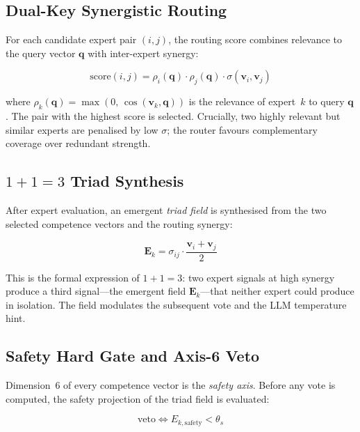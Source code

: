 \documentclass[journal,10pt,twocolumn]{IEEEtran}
\begin{document}
\subsection{Dual-Key Synergistic Routing}

For each candidate expert pair $(i, j)$, the routing score combines
relevance to the query vector $\mathbf{q}$ with inter-expert synergy:

\begin{equation}
  \mathrm{score}(i, j)
    = \rho_i(\mathbf{q}) \cdot \rho_j(\mathbf{q}) \cdot \sigma(\mathbf{v}_i, \mathbf{v}_j)
  \label{eq:routing}
\end{equation}

where $\rho_k(\mathbf{q}) = \max(0,\, \cos(\mathbf{v}_k, \mathbf{q}))$
is the relevance of expert~$k$ to query $\mathbf{q}$. The pair with the
highest score is selected. Crucially, two highly relevant but similar
experts are penalised by low $\sigma$; the router favours complementary
coverage over redundant strength.

\subsection{$1{+}1{=}3$ Triad Synthesis}

After expert evaluation, an emergent \emph{triad field} is synthesised from
the two selected competence vectors and the routing synergy:

\begin{equation}
  \mathbf{E}_k = \sigma_{ij} \cdot \frac{\mathbf{v}_i + \mathbf{v}_j}{2}
  \label{eq:triad}
\end{equation}

This is the formal expression of $1{+}1{=}3$: two expert signals at high
synergy produce a third signal—the emergent field $\mathbf{E}_k$—that
neither expert could produce in isolation. The field modulates the
subsequent vote and the LLM temperature hint.

\subsection{Safety Hard Gate and Axis-6 Veto}

Dimension~6 of every competence vector is the \emph{safety axis}. Before
any vote is computed, the safety projection of the triad field is evaluated:

\begin{equation}
  \text{veto} \iff E_{k,\text{safety}} < \theta_s
  \label{eq:veto}
\end{equation}
\end{document}
